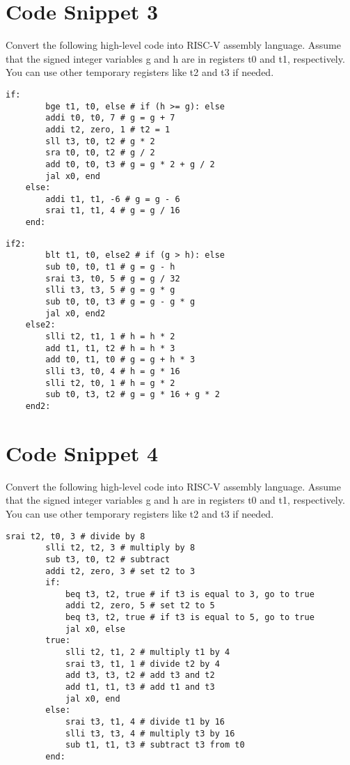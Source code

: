 \documentclass[12pt]{article}
\begin{document}
    \newpage
    \section{Code Snippet 3}
    \begin{flushleft}
        Convert the following high-level code into RISC-V assembly language. Assume
        that the signed integer variables g and h are in registers t0 and t1, respectively. You can
        use other temporary registers like t2 and t3 if needed.
    \end{flushleft}
    \begin{lstlisting}[language=RISCV]
    if: 
        bge t1, t0, else # if (h >= g): else
        addi t0, t0, 7 # g = g + 7
        addi t2, zero, 1 # t2 = 1
        sll t3, t0, t2 # g * 2
        sra t0, t0, t2 # g / 2
        add t0, t0, t3 # g = g * 2 + g / 2
        jal x0, end
    else:
        addi t1, t1, -6 # g = g - 6
        srai t1, t1, 4 # g = g / 16
    end:
    \end{lstlisting}

    \begin{lstlisting}[language=RISCV]
    if2: 
        blt t1, t0, else2 # if (g > h): else
        sub t0, t0, t1 # g = g - h
        srai t3, t0, 5 # g = g / 32
        slli t3, t3, 5 # g = g * g
        sub t0, t0, t3 # g = g - g * g
        jal x0, end2
    else2:
        slli t2, t1, 1 # h = h * 2
        add t1, t1, t2 # h = h * 3
        add t0, t1, t0 # g = g + h * 3
        slli t3, t0, 4 # h = g * 16
        slli t2, t0, 1 # h = g * 2
        sub t0, t3, t2 # g = g * 16 + g * 2
    end2:
        \end{lstlisting}
    \newpage
    \section{Code Snippet 4}
    \begin{flushleft}
        Convert the following high-level code into RISC-V assembly language. Assume
        that the signed integer variables g and h are in registers t0 and t1, respectively. You can
        use other temporary registers like t2 and t3 if needed.
    \end{flushleft}
    \begin{lstlisting}[language=RISCV]
        srai t2, t0, 3 # divide by 8
        slli t2, t2, 3 # multiply by 8
        sub t3, t0, t2 # subtract
        addi t2, zero, 3 # set t2 to 3
        if:
            beq t3, t2, true # if t3 is equal to 3, go to true
            addi t2, zero, 5 # set t2 to 5
            beq t3, t2, true # if t3 is equal to 5, go to true
            jal x0, else
        true:
            slli t2, t1, 2 # multiply t1 by 4
            srai t3, t1, 1 # divide t2 by 4
            add t3, t3, t2 # add t3 and t2
            add t1, t1, t3 # add t1 and t3
            jal x0, end
        else:
            srai t3, t1, 4 # divide t1 by 16
            slli t3, t3, 4 # multiply t3 by 16
            sub t1, t1, t3 # subtract t3 from t0
        end:
    \end{lstlisting}
\end{document}

